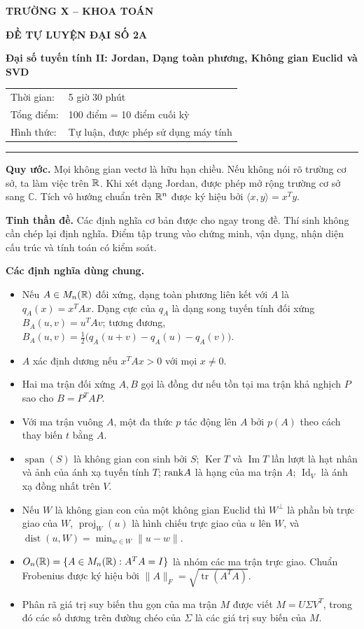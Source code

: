 ﻿\documentclass[12pt,a4paper]{article}
\providecommand{\C}{\mathbb{C}}
\DeclareMathOperator{\Ker}{Ker}
\DeclareMathOperator{\Imv}{Im}
\DeclareMathOperator{\Span}{span}
\DeclareMathOperator{\proj}{proj}
\DeclareMathOperator{\dist}{dist}
\DeclareMathOperator{\tr}{tr}
\DeclareMathOperator{\Id}{Id}
\begin{document}
\begin{center}
    {\Large\textbf{TRƯỜNG X -- KHOA TOÁN}}\par
    \vspace{4pt}
    {\large\textbf{ ĐỀ TỰ LUYỆN ĐẠI SỐ 2A}}\par
    \vspace{4pt}
    {\textbf{ Đại số tuyến tính II: Jordan, Dạng toàn phương, Không gian Euclid và SVD}}\par
    \vspace{8pt}
    \begin{tabular}{ll}
        Thời gian: & 5 giờ 30 phút \\
        Tổng điểm: & 100 điểm = 10 điểm cuối kỳ \\
        Hình thức: & Tự luận, được phép sử dụng máy tính \\
    \end{tabular}
\end{center}

\vspace{4pt}
\hrule
\vspace{8pt}

\textbf{Quy ước.} Mọi không gian vectơ là hữu hạn chiều. Nếu không nói rõ trường cơ sở, ta làm việc trên $\mathbb{R}$. Khi xét dạng Jordan, được phép mở rộng trường cơ sở sang $\C$. Tích vô hướng chuẩn trên $\mathbb{R}^n$ được ký hiệu bởi $\langle x,y\rangle=x^Ty$.

\textbf{Tinh thần đề.} Các định nghĩa cơ bản được cho ngay trong đề. Thí sinh không cần chép lại định nghĩa. Điểm tập trung vào chứng minh, vận dụng, nhận diện cấu trúc và tính toán có kiểm soát.

\textbf{Các định nghĩa dùng chung.}
\begin{itemize}
    \item Nếu $A\in M_n(\mathbb{R})$ đối xứng, dạng toàn phương liên kết với $A$ là $q_A(x)=x^TAx$. Dạng cực của $q_A$ là dạng song tuyến tính đối xứng $B_A(u,v)=u^TAv$; tương đương, $B_A(u,v)=\frac{1}{2}\big(q_A(u+v)-q_A(u)-q_A(v)\big)$.
    \item $A$ xác định dương nếu $x^TAx>0$ với mọi $x\ne0$.
    \item Hai ma trận đối xứng $A,B$ gọi là đồng dư nếu tồn tại ma trận khả nghịch $P$ sao cho $B=P^TAP$.
    \item Với ma trận vuông $A$, một đa thức $p$ tác động lên $A$ bởi $p(A)$ theo cách thay biến $t$ bằng $A$.
    \item $\Span(S)$ là không gian con sinh bởi $S$; $\Ker T$ và $\Imv T$ lần lượt là hạt nhân và ảnh của ánh xạ tuyến tính $T$; $\mathrm{rank} A$ là hạng của ma trận $A$; $\Id_V$ là ánh xạ đồng nhất trên $V$.
    \item Nếu $W$ là không gian con của một không gian Euclid thì $W^\perp$ là phần bù trực giao của $W$, $\proj_W(u)$ là hình chiếu trực giao của $u$ lên $W$, và $\dist(u,W)=\min_{w\in W}\|u-w\|$.
    \item $O_n(\mathbb{R})=\{A\in M_n(\mathbb{R}):A^TA=I\}$ là nhóm các ma trận trực giao. Chuẩn Frobenius được ký hiệu bởi $\|A\|_F=\sqrt{\tr(A^TA)}$.
    \item Phân rã giá trị suy biến thu gọn của ma trận $M$ được viết $M=U\Sigma V^T$, trong đó các số dương trên đường chéo của $\Sigma$ là các giá trị suy biến của $M$.
\end{itemize}
\newpage
\end{document}
